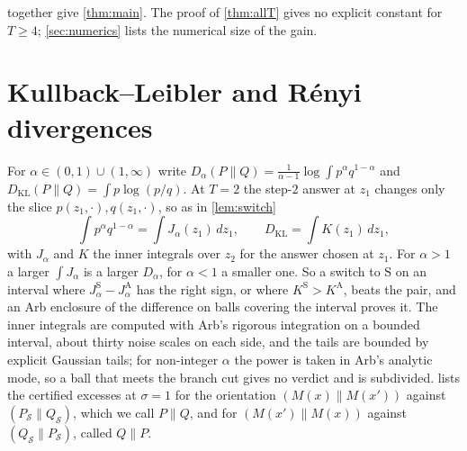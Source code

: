 \documentclass[11pt]{amsart}
\theoremstyle{definition}
\theoremstyle{remark}
\newcommand{\ANTI}{\mathrm{A}}
\newcommand{\SAME}{\mathrm{S}}
\begin{document}
 together give \cref{thm:main}. The proof of \cref{thm:allT} gives no explicit constant for $T\ge4$; \cref{sec:numerics} lists the numerical size of the gain.

\section{Kullback--Leibler and R\'enyi divergences}\label{sec:renyi}

For $\alpha\in(0,1)\cup(1,\infty)$ write $D_\alpha(P\|Q)=\frac1{\alpha-1}\log\int p^\alpha q^{1-\alpha}$ and $D_{\mathrm{KL}}(P\|Q)=\int p\log(p/q)$. At $T=2$ the step-$2$ answer at $z_1$ changes only the slice $p(z_1,\cdot),q(z_1,\cdot)$, so as in \cref{lem:switch}
\[
\int p^\alpha q^{1-\alpha}=\int J_\alpha(z_1)\,dz_1,\qquad D_{\mathrm{KL}}=\int K(z_1)\,dz_1,
\]
with $J_\alpha$ and $K$ the inner integrals over $z_2$ for the answer chosen at $z_1$. For $\alpha>1$ a larger $\int J_\alpha$ is a larger $D_\alpha$, for $\alpha<1$ a smaller one. So a switch to $\SAME$ on an interval where $J_\alpha^{\SAME}-J_\alpha^{\ANTI}$ has the right sign, or where $K^{\SAME}>K^{\ANTI}$, beats the pair, and an Arb enclosure of the difference on balls covering the interval proves it. The inner integrals are computed with Arb's rigorous integration on a bounded interval, about thirty noise scales on each side, and the tails are bounded by explicit Gaussian tails; for non-integer $\alpha$ the power is taken in Arb's analytic mode, so a ball that meets the branch cut gives no verdict and is subdivided.  lists the certified excesses at $\sigma=1$ for the orientation $(M(x)\|M(x'))$ against $(P_{\mathcal S}\|Q_{\mathcal S})$, which we call $P\|Q$, and for $(M(x')\|M(x))$ against $(Q_{\mathcal S}\|P_{\mathcal S})$, called $Q\|P$.
\end{document}
